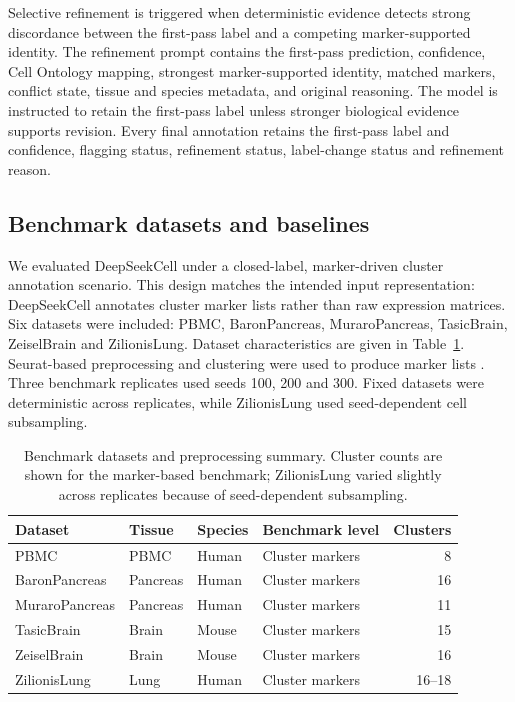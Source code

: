 \documentclass[unnumsec,webpdf,contemporary,large,numbered]{oup-authoring-template}
\begin{document}
Selective refinement is triggered when deterministic evidence detects strong discordance between the first-pass label and a competing marker-supported identity. The refinement prompt contains the first-pass prediction, confidence, Cell Ontology mapping, strongest marker-supported identity, matched markers, conflict state, tissue and species metadata, and original reasoning. The model is instructed to retain the first-pass label unless stronger biological evidence supports revision. Every final annotation retains the first-pass label and confidence, flagging status, refinement status, label-change status and refinement reason.

\subsection{Benchmark datasets and baselines}

We evaluated DeepSeekCell under a closed-label, marker-driven cluster annotation scenario. This design matches the intended input representation: DeepSeekCell annotates cluster marker lists rather than raw expression matrices. Six datasets were included: PBMC, BaronPancreas, MuraroPancreas, TasicBrain, ZeiselBrain and ZilionisLung. Dataset characteristics are given in Table~\ref{tab:datasets}. Seurat-based preprocessing and clustering were used to produce marker lists \cite{hao2021seurat,seurat}. Three benchmark replicates used seeds 100, 200 and 300. Fixed datasets were deterministic across replicates, while ZilionisLung used seed-dependent cell subsampling.

\begin{table}[!t]
\caption{Benchmark datasets and preprocessing summary. Cluster counts are shown for the marker-based benchmark; ZilionisLung varied slightly across replicates because of seed-dependent subsampling.}
\label{tab:datasets}
\centering
\begin{tabular}{llllr}
\toprule
Dataset & Tissue & Species & Benchmark level & Clusters\\
\midrule
PBMC & PBMC & Human & Cluster markers & 8\\
BaronPancreas & Pancreas & Human & Cluster markers & 16\\
MuraroPancreas & Pancreas & Human & Cluster markers & 11\\
TasicBrain & Brain & Mouse & Cluster markers & 15\\
ZeiselBrain & Brain & Mouse & Cluster markers & 16\\
ZilionisLung & Lung & Human & Cluster markers & 16--18\\
\bottomrule
\end{tabular}
\end{table}
\end{document}
